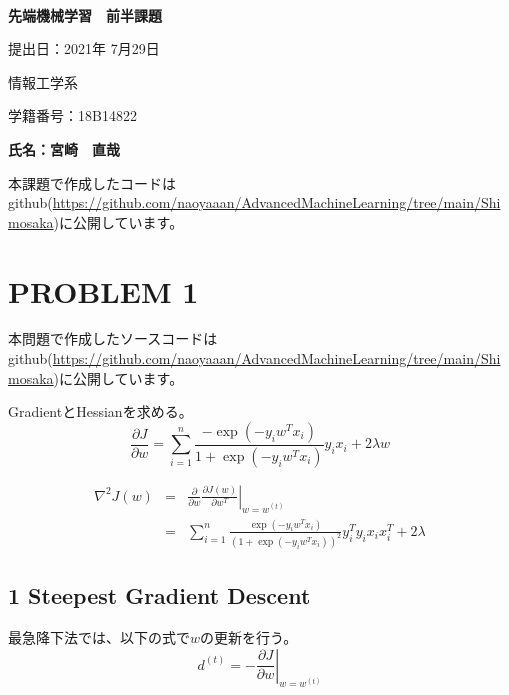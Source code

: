 \documentclass[a4j,11pt]{jarticle}
\begin{document}
\begin{center}
　\vspace{10mm}

{\bf {\huge 先端機械学習　前半課題}}

\vspace{80mm}

提出日：2021年 7月29日

\vspace{10mm}

情報工学系

\vspace{10mm}

学籍番号：18B14822

\vspace{10mm}


\vspace{20mm}

{\bf {\LARGE 氏名：宮崎　直哉}}
\end{center}





\newpage



本課題で作成したコードはgithub(\url{https://github.com/naoyaaan/AdvancedMachineLearning/tree/main/Shimosaka})に公開しています。

\section{PROBLEM 1}
本問題で作成したソースコードはgithub(\url{https://github.com/naoyaaan/AdvancedMachineLearning/tree/main/Shimosaka})に公開しています。

GradientとHessianを求める。
\begin{equation}
    \frac{\partial{J}}{\partial{w}} = \sum_{i=1}^{n} \frac{-\exp(-y_iw^{T}x_i)}{1 + \exp(-y_iw^{T}x_i)}y_{i}x_{i} + 2\lambda w
\end{equation}

\begin{eqnarray}
    \nabla^2 J(w) &=& \frac{\partial}{\partial w} \left.\frac{\partial J(w)}{\partial w^{T}}\right|_{w=w^{(t)}} \\
    &=& \sum_{i=1}^{n} \frac{\exp(-y_iw^{T}x_i)}{(1 + \exp(-y_iw^{T}x_i))^2}y^{T}_{i}y_{i}x_{i}x^{T}_{i} + 2\lambda
\end{eqnarray}

\subsection*{1 Steepest Gradient Descent}
最急降下法では、以下の式で$w$の更新を行う。
\begin{equation}
    d^{(t)} = -\left.\frac{\partial{J}}{\partial{w}}\right|_{w=w^{(t)}}
\end{equation}
\end{document}
